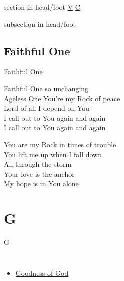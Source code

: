\documentclass{beamer}
\begin{document}
{
{ 
 {
 \begin{beamercolorbox}[ht=4.5ex,dp=1.5ex,%
      leftskip=.3cm,rightskip=.3cm plus1fil]{section in head/foot}
 \fontsize{12}{25}\selectfont 
\hyperlink{Faithful One[]V}{V}
\hyperlink{Faithful One[]C}{C}
 
 \end{beamercolorbox}%
  \begin{beamercolorbox}[ht=2.5ex,dp=1.125ex,%
   leftskip=.3cm,rightskip=.3cm plus1fil]{subsection in head/foot}
   \insertauthor
 \end{beamercolorbox}%
 }
}
\subsection{ Faithful One }

\hypertarget{Faithful One[]V}{}
\begin{frame}{Faithful One }
\fontsize{ 20 }{ 27 }\selectfont

Faithful One so unchanging\\ 
Ageless One You're my Rock of peace\\ 
Lord of all I depend on You\\ 
I call out to You again and again\\ 
I call out to You again and again 

\end{frame}

\hypertarget{Faithful One[]C}{}
\begin{frame}{}
\fontsize{ 20 }{ 27 }\selectfont

You are my Rock in times of trouble\\ 
You lift me up when I fall down\\ 
All through the storm\\ 
Your love is the anchor\\ 
My hope is in You alone 

\end{frame}

}
\section{G}

\begin{frame}{G}
\begin{columns}
    \begin{itemize}
    \item \hyperlink{Goodness of God['All my life You have been faithful']1}{Goodness of God }
\end{itemize}


\end{columns}

\end{frame}
\end{document}
